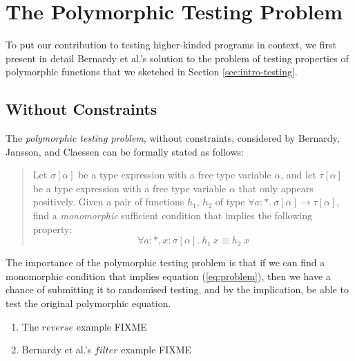 \documentclass{llncs}
\begin{document}


\section{The Polymorphic Testing Problem}

To put our contribution to testing higher-kinded programs in context,
we first present in detail Bernardy et al.'s solution to the problem
of testing properties of polymorphic functions that we sketched in
Section \ref{sec:intro-testing}.

\subsection{Without Constraints}
\label{sec:without-constraints}

The {\em polymorphic testing problem}, without constraints, considered
by Bernardy, Jansson, and Claessen can be formally stated as follows:

\begin{verse}\label{problem:poly-testing}
  \hspace*{0.2in}Let $\sigma[\alpha]$ be a type expression with a free
  type variable $\alpha$, and let $\tau[\alpha]$ be a type expression
  with a free type variable $\alpha$ that only appears
  positively. Given a pair of functions $h_1$, $h_2$ of type
  $\forall a : *.~\sigma[\alpha] \to \tau[\alpha]$, find a
  \emph{monomorphic} sufficient condition that implies the following
  property:
  \begin{equation}
    \label{eq:problem}
    \forall a : *, x : \sigma[\alpha].~h_1~x \equiv h_2~x
  \end{equation}
\end{verse}
The importance of the polymorphic testing problem is that if we can
find a monomorphic condition that implies equation (\ref{eq:problem}),
then we have a chance of submitting it to randomised testing, and by
the implication, be able to test the original polymorphic equation.
\begin{example}
  \begin{enumerate}
  \item The $\mathit{reverse}$ example FIXME
  \item Bernardy et al.'s $\mathit{filter}$ example FIXME
  \end{enumerate}
\end{example}
\end{document}
